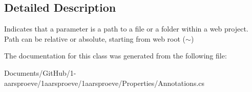 \subsection{Detailed Description}
Indicates that a parameter is a path to a file or a folder within a web project. Path can be relative or absolute, starting from web root ($\sim$) 



The documentation for this class was generated from the following file\+:\begin{DoxyCompactItemize}
\item 
Documents/\+Git\+Hub/1-\/aarsproeve/1aarsproeve/1aarsproeve/\+Properties/Annotations.\+cs\end{DoxyCompactItemize}
